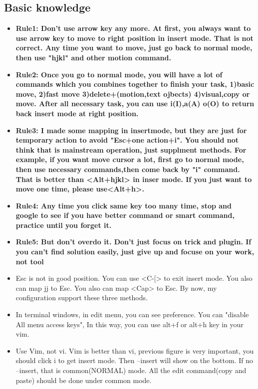 \documentclass[a4paper,12pt,twoside]{book}
\begin{document}
\subsection{Basic knowledge}

\begin{itemize}
		\item \textbf{Rule1: Don't use arrow key any more. At first, you always want to use arrow key to move to right position in insert mode. That is not correct. Any time you want to move, just go back to normal mode, then use "hjkl" and other motion command.}

		\item \textbf{Rule2: Once you go to normal mode, you will have a lot of commands which you combines together to finish your task, 1)basic move, 2)fast move 3)delete+(motion,text ojbects) 4)visual,copy or move. After all necessary task, you can use i(I),a(A) o(O) to return back insert mode at right position.}

		\item \textbf{Rule3: I made some mapping in insertmode, but they are just for temporary action to avoid "Esc+one action+i". You should not think that is mainstream operation, just supplment methods. For example, if you want move cursor a lot, first go to normal mode, then use necessary commands,then come back by "i" command. That is better than <Alt+hjkl> in inser mode. If you just want to move one time, please use<Alt+h>.}

		\item \textbf{Rule4: Any time you click same key too many time, stop and google to see if you have better command or smart command, practice until you forget it. }
		\item \textbf{Rule5: But don't overdo it. Don't just focus on trick and plugin. If you can't find solution easily, just give up and focuse on your work, not tool}
		\item Esc is not in good position. You can use <C-$[$> to exit insert mode. You also can map jj to Esc. You also can map <Cap> to Esc. By now, my configuration support these three methods. 

		\item In terminal windows, in edit menu, you can see preference. You can "disable All menu access keys", In this way, you can use alt+f or alt+h key in your vim. 

		\item Use Vim, not vi. Vim is better than vi, previous figure is very important, you should click i to get insert mode. Then --insert will show on the bottom. If no --insert, that is common(NORMAL) mode. All the edit command(copy and paste) should be done under common mode. 


\end{itemize}
\end{document}
